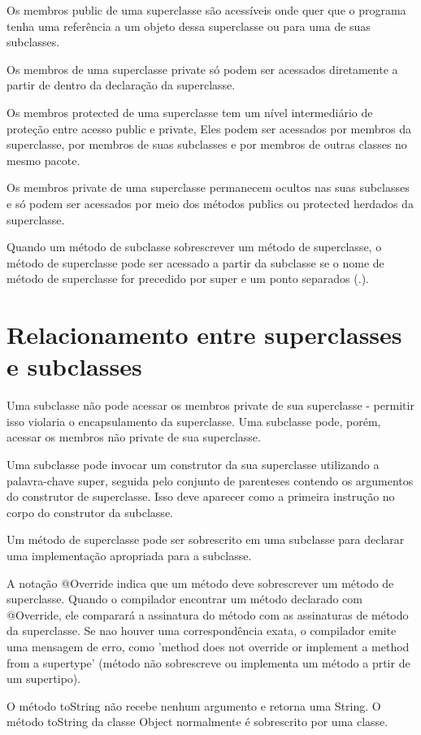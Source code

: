 \documentclass[a4paper,10pt]{article}
\begin{document}
Os membros public de uma superclasse são acessíveis onde quer que o programa tenha uma referência a um objeto dessa superclasse ou para uma de suas subclasses.

Os membros de uma superclasse private só podem ser acessados diretamente a partir de dentro da declaração da superclasse.

Os membros protected de uma superclasse tem um nível intermediário de proteção entre acesso public e private, Eles podem ser acessados por membros da superclasse, por membros de suas subclasses e por membros de outras classes no mesmo pacote.

Os membros private de uma superclasse permanecem ocultos nas suas subclasses e só podem ser acessados por meio dos métodos publics ou protected herdados da superclasse.

Quando um método de subclasse sobrescrever um método de superclasse, o método de superclasse pode ser acessado a partir da subclasse se o nome de método de superclasse for precedido por super e um ponto separados (.).

\section{Relacionamento entre superclasses e subclasses}

Uma subclasse não pode acessar os membros private de sua superclasse - permitir isso violaria o encapsulamento da superclasse. Uma subclasse pode, porém, acessar os membros não private de sua superclasse.

Uma subclasse pode invocar um construtor da sua superclasse utilizando a palavra-chave super, seguida pelo conjunto de parenteses contendo os argumentos do construtor de superclasse. Isso deve aparecer como a primeira instrução no corpo do construtor da subclasse.

Um método de superclasse pode ser sobrescrito em uma subclasse para declarar uma implementação apropriada para a subclasse.

A  notação @Override indica que um método deve sobrescrever um método de superclasse. Quando o compilador encontrar um método declarado com @Override, ele comparará a assinatura do método com as assinaturas de método da superclasse. Se nao houver uma correspondência exata, o compilador emite uma mensagem de erro, como 'method does not override or implement a method from a supertype' (método não sobrescreve ou implementa um método a prtir de um supertipo).

O método toString não recebe nenhum argumento e retorna uma String. O método toString da classe Object normalmente é sobrescrito por uma classe.
\end{document}
